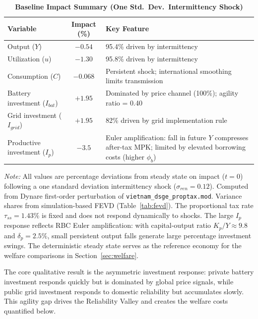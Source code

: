 \documentclass[12pt, a4paper]{article}
\begin{document}
	\begin{table}[H]
		\centering
		\caption{\textbf{Baseline Impact Summary (One Std.\ Dev.\ Intermittency Shock)}}
		\label{tab:baseline_summary}
		\renewcommand{\arraystretch}{1.3}
		\small
		\begin{tabular}{l c p{7cm}}
			\toprule
			\textbf{Variable} & \textbf{Impact (\%)} & \textbf{Key Feature} \\
			\midrule
			Output ($Y$) & $-0.54$ & 95.4\% driven by intermittency \\
			Utilization ($u$) & $-1.30$ & 95.8\% driven by intermittency \\
			Consumption ($C$) & $-0.068$ & Persistent shock; international smoothing limits transmission \\
			Battery investment ($I_{bat}$) & $+1.95$ & Dominated by price channel (100\%); agility ratio = 0.40 \\
			Grid investment ($I_{grid}$) & $+1.95$ & 82\% driven by grid implementation rule \\
			Productive investment ($I_p$) & $-3.5$ & Euler amplification: fall in future $Y$ compresses after-tax MPK; limited by elevated borrowing costs (higher $\phi_b$) \\
			\bottomrule
		\end{tabular}
		\vspace{0.2cm}
		\parbox{\textwidth}{\footnotesize \textit{Note:} All values are percentage deviations from steady state on impact ($t=0$) following a one standard deviation intermittency shock ($\sigma_{ren} = 0.12$). Computed from Dynare first-order perturbation of \texttt{vietnam\_dsge\_proptax.mod}. Variance shares from simulation-based FEVD (Table~\ref{tab:fevd}). The proportional tax rate $\tau_{ss}=1.43\%$ is fixed and does not respond dynamically to shocks. The large $I_p$ response reflects RBC Euler amplification: with capital-output ratio $K_p/Y \approx 9.8$ and $\delta_p = 2.5\%$, small persistent output falls generate large percentage investment swings. The deterministic steady state serves as the reference economy for the welfare comparisons in Section~\ref{sec:welfare}.}
	\end{table}
	
	\noindent The core qualitative result is the asymmetric investment response: private battery investment responds quickly but is dominated by global price signals, while public grid investment responds to domestic reliability but accumulates slowly. This agility gap drives the Reliability Valley and creates the welfare costs quantified below.
	
\end{document}
